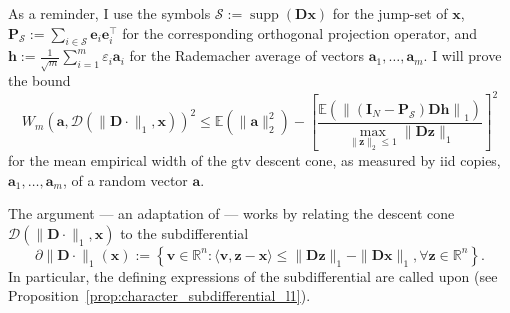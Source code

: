 As a reminder, I use the symbols $\mathcal{S} := \operatorname{supp}\left ( \mathbf{Dx} \right )$ for the jump-set of $\mathbf{x}$, $\mathbf{P}_\mathcal{S} := \sum_{i \in \mathcal{S}} \mathbf{e}_i \mathbf{e}_i^\top$ for the corresponding orthogonal projection operator, and $\mathbf{h} := \frac{1}{\sqrt{m}} \sum_{i=1}^{m} \varepsilon_i \mathbf{a}_i$ for the Rademacher average of vectors $\mathbf{a}_1, \dots, \mathbf{a}_m$. I will prove the bound
\begin{equation*}
    W_{m}(\mathbf{a}, \mathcal{D}( \|\mathbf{D} \cdot \|_1, \mathbf{x}))^2 \leq \mathbb{E} \left ( \|\mathbf{a}\|_2^2 \right ) - \left [ \frac{\mathbb{E} \left ( \left \|(\mathbf{I}_N - \mathbf{P}_\mathcal{S}) \mathbf{Dh} \right \|_1 \right )}{\underset{\|\mathbf{z}\|_2 \leq 1}{\max} \| \mathbf{Dz} \|_1} \right ]^2
\end{equation*}
for the mean empirical width of the \acrshort{gtv} descent cone, as measured by \acrshort{iid} copies, $\mathbf{a}_1, \dots, \mathbf{a}_m$, of a random vector $\mathbf{a}$.

The argument --- an adaptation of \cite[Lem. 1 \& Thm. 3]{kabanava2015a} --- works by relating the descent cone $\mathcal{D}( \|\mathbf{D} \cdot \|_1, \mathbf{x})$ to the subdifferential
\begin{equation}
    \partial \|\mathbf{D} \cdot \|_1 (\mathbf{x}) := \left\{ \mathbf{v} \in \mathbb{R}^{n} : \langle \mathbf{v},  \mathbf{z} - \mathbf{x}\rangle \leq \|\mathbf{Dz} \|_1 - \|\mathbf{Dx} \|_1, \forall \mathbf{z} \in \mathbb{R}^{n} \right\}.
\end{equation}
In particular, the defining expressions of the subdifferential are called upon (see Proposition~\ref{prop:character_subdifferential_l1}).

